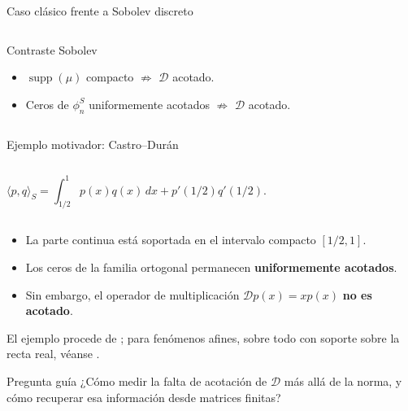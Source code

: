 \documentclass[aspectratio=169,10pt]{beamer}
\newcommand{\D}{\mathcal{D}}
\newcommand{\supp}{\operatorname{supp}}
\begin{document}
\begin{frame}{Caso clásico frente a Sobolev discreto}
\begin{columns}[T,onlytextwidth]
    \begin{alertblock}{Contraste Sobolev}
      \footnotesize
      \begin{itemize}
        \item \(\supp(\mu)\) compacto \(\not\Rightarrow\) \(\D\) acotado.
        \item Ceros de \(\phi_n^S\) uniformemente acotados \(\not\Rightarrow\) \(\D\) acotado.
      \end{itemize}
    \end{alertblock}
  \end{columns}
\end{frame}

\begin{frame}{Ejemplo motivador: Castro--Durán}
  \small
  \vspace{-4mm}
  \begin{columns}[T,onlytextwidth]
    \[
      \langle p,q\rangle_S
      =
      \int_{1/2}^{1} p(x)q(x)\,dx
      +
      p'(1/2)q'(1/2).
    \]

    \centering
  \end{columns}

  \vspace{2mm}
  \begin{itemize}
    \item La parte continua está soportada en el intervalo compacto \([1/2,1]\).
    \item Los ceros de la familia ortogonal permanecen \textbf{uniformemente acotados}.
    \item Sin embargo, el operador de multiplicación \(\D p(x)=xp(x)\) \textbf{no es acotado}.
  \end{itemize}

  {\scriptsize El ejemplo procede de \cite{CastroDuran2003}; para fenómenos afines, sobre todo con soporte sobre la recta real,
    véanse \cite{AMRR92,ALR96,AlfRez01,Mei93,GK97}.}

  \begin{alertblock}{Pregunta guía}
    ¿Cómo medir la falta de acotación de \(\D\) más allá de la norma, y cómo recuperar esa información desde matrices finitas?
  \end{alertblock}
\end{frame}
\end{document}
